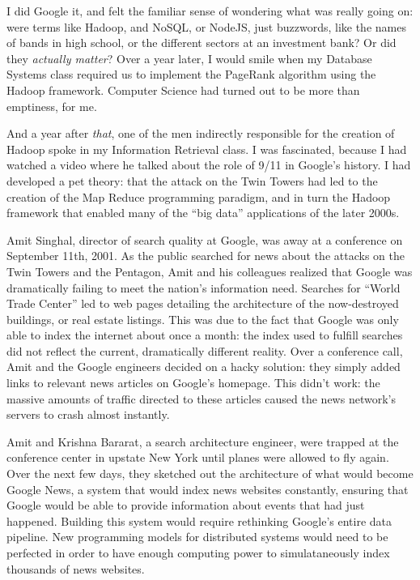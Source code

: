 I did Google it, and felt the familiar sense of wondering what was really going
on: were terms like Hadoop, and NoSQL, or NodeJS, just buzzwords, like the names
of bands in high school, or the different sectors at an investment bank?  Or did
they \textit{actually matter}?  Over a year later, I would smile when my Database Systems class
required us to implement the PageRank algorithm using the Hadoop framework.
Computer Science had turned out to be more than emptiness, for me.

And a year after \textit{that}, one of the men indirectly responsible for the
creation of Hadoop spoke in my Information Retrieval class.  I was fascinated,
because I had watched a video where he talked about the role of 9/11 in Google's
history.  I had developed a pet theory: that the attack on the Twin Towers had
led to the creation of the Map Reduce programming paradigm, and in turn the
Hadoop framework that enabled many of the ``big data'' applications of the later
2000s.

Amit Singhal, director of search quality at Google, was away at a conference on
September 11th, 2001. As the public searched for news about the attacks on the
Twin Towers and the Pentagon, Amit and his colleagues realized that Google was
dramatically failing to meet the nation's information need. Searches for ``World
Trade Center'' led to web pages detailing the architecture of the now-destroyed
buildings, or real estate listings.  This was due to the fact that Google was
only able to index the internet about once a month: the index used to fulfill
searches did not reflect the current, dramatically different reality.  Over a
conference call, Amit and the Google engineers decided on a hacky solution: they
simply added links to relevant news articles on Google's homepage.  This didn't
work: the massive amounts of traffic directed to these articles caused the news
network's servers to crash almost instantly.

Amit and Krishna Bararat, a search architecture engineer, were trapped at the
conference center in upstate New York until planes were allowed to fly again.
Over the next few days, they sketched out the architecture of what would become
Google News, a system that would index news websites constantly, ensuring that
Google would be able to provide information about events that had just happened.
Building this system would require rethinking Google's entire data pipeline.
New programming models for distributed systems would need to be perfected in
order to have enough computing power to simulataneously index thousands of news
websites.

